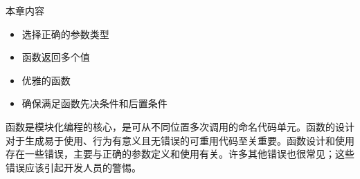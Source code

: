 本章内容

\begin{itemize}
\item
选择正确的参数类型

\item
函数返回多个值

\item
优雅的函数

\item
确保满足函数先决条件和后置条件
\end{itemize}

函数是模块化编程的核心，是可从不同位置多次调用的命名代码单元。函数的设计对于生成易于使用、行为有意义且无错误的可重用代码至关重要。函数设计和使用存在一些错误，主要与正确的参数定义和使用有关。许多其他错误也很常见；这些错误应该引起开发人员的警惕。
